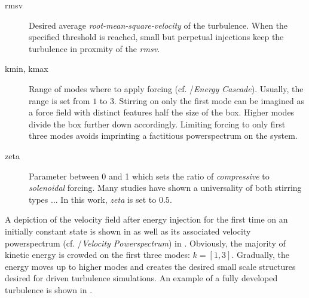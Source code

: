 \begin{description}
    \item [rmsv] Desired average \emph{root-mean-square-velocity} of the turbulence. When the
            specified threshold is reached, small but perpetual injections keep the turbulence
            in proxmity of the \emph{rmsv}.
    \item [kmin, kmax] Range of modes where to apply forcing (cf.
        /\emph{Energy Cascade}). Usually, the range is set from $1$ to
        $3$. Stirring on only the first mode can be imagined as a force field with
        distinct features half the size of the box. Higher modes divide the box further
        down accordingly. Limiting forcing to only first three modes avoids imprinting
        a factitious powerspectrum on the system.
    \item [zeta] Parameter between 0 and 1 which sets the ratio of \emph{compressive} 
            to \emph{solenoidal} forcing. Many studies have shown a universality of 
            both stirring types ... In this work, \emph{zeta} is set to $0.5$.
\end{description}
A depiction of the velocity field after energy injection for the first time on
an initially constant state is shown in
 as well as its associated velocity
powerspectrum (cf. /\emph{Velocity Powerspectrum}) in
.  Obviously, the majority of kinetic energy
is crowded on the first three modes: $k = [1,3]$. Gradually, the energy moves
up to higher modes and creates the desired small scale structures desired for
driven turbulence simulations. An example of a fully developed turbulence
is shown in .
